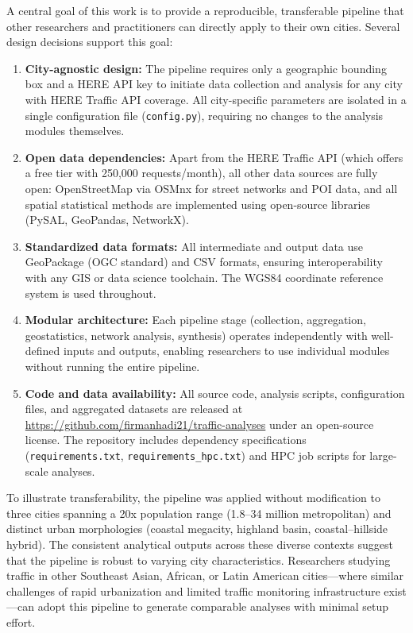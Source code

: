 \documentclass[12pt,a4paper]{article}
\begin{document}
A central goal of this work is to provide a reproducible, transferable pipeline that other researchers and practitioners can directly apply to their own cities. Several design decisions support this goal:

\begin{enumerate}
\def\labelenumi{\arabic{enumi}.}

\item
  \textbf{City-agnostic design:} The pipeline requires only a geographic bounding box and a HERE API key to initiate data collection and analysis for any city with HERE Traffic API coverage. All city-specific parameters are isolated in a single configuration file (\texttt{config.py}), requiring no changes to the analysis modules themselves.

\item
  \textbf{Open data dependencies:} Apart from the HERE Traffic API (which offers a free tier with 250,000 requests/month), all other data sources are fully open: OpenStreetMap via OSMnx for street networks and POI data, and all spatial statistical methods are implemented using open-source libraries (PySAL, GeoPandas, NetworkX).

\item
  \textbf{Standardized data formats:} All intermediate and output data use GeoPackage (OGC standard) and CSV formats, ensuring interoperability with any GIS or data science toolchain. The WGS84 coordinate reference system is used throughout.

\item
  \textbf{Modular architecture:} Each pipeline stage (collection, aggregation, geostatistics, network analysis, synthesis) operates independently with well-defined inputs and outputs, enabling researchers to use individual modules without running the entire pipeline.

\item
  \textbf{Code and data availability:} All source code, analysis scripts, configuration files, and aggregated datasets are released at \url{https://github.com/firmanhadi21/traffic-analyses} under an open-source license. The repository includes dependency specifications (\texttt{requirements.txt}, \texttt{requirements\_hpc.txt}) and HPC job scripts for large-scale analyses.

\end{enumerate}

To illustrate transferability, the pipeline was applied without modification to three cities spanning a 20x population range (1.8--34 million metropolitan) and distinct urban morphologies (coastal megacity, highland basin, coastal--hillside hybrid). The consistent analytical outputs across these diverse contexts suggest that the pipeline is robust to varying city characteristics. Researchers studying traffic in other Southeast Asian, African, or Latin American cities---where similar challenges of rapid urbanization and limited traffic monitoring infrastructure exist---can adopt this pipeline to generate comparable analyses with minimal setup effort.
\end{document}
